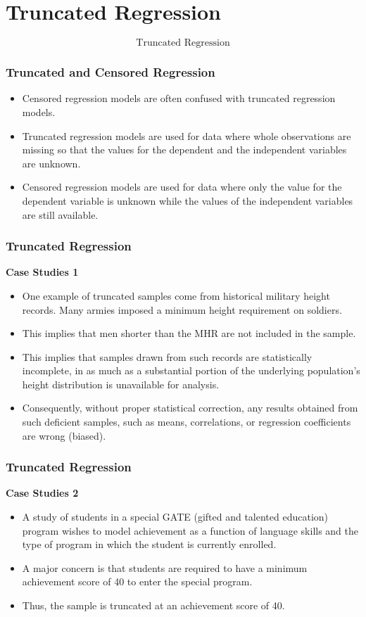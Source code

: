 \documentclass{beamer}
\begin{document}
\section{Truncated Regression}
\begin{frame}
	\LARGE
	\[\mbox{Truncated Regression}\]
\end{frame}
\begin{frame}[fragile]
	\frametitle{Truncated and Censored Regression}
	\large
	\begin{itemize}
		\item Censored regression models are often confused with truncated regression models. 
		\item Truncated regression models are used for data where whole observations are missing so that the values for the dependent and the independent variables are unknown. \item Censored regression models are used for data where only the value for the dependent variable  is unknown while the values of the independent variables are still available.
	\end{itemize}
	
\end{frame}
\begin{frame}
	\frametitle{Truncated Regression}
	\noindent \textbf{Case Studies 1}
	\begin{itemize}
		\item One example of truncated samples come from historical military height records. Many armies imposed a minimum height requirement on soldiers. 
		\item This implies that men shorter than the MHR are not included in the sample. 
		\item This implies that samples drawn from such records are statistically incomplete, in as much as a substantial portion of the underlying population's height distribution is unavailable for analysis. 
		\item Consequently, without proper statistical correction, any results obtained from such deficient samples, such as means, correlations, or regression coefficients are wrong (biased). 
	\end{itemize}
\end{frame}
\begin{frame}
	\frametitle{Truncated Regression}
	\noindent \textbf{Case Studies 2}
	\begin{itemize}
		\item A study of students in a special GATE (gifted and talented education) program wishes to model achievement as a function of language skills and the type of program in which the student is currently enrolled. 
		\item A major concern is that students are required to have a minimum achievement score of 40 to enter the special program. 
		\item Thus, the sample is truncated at an achievement score of 40.
		\end{itemize}
	\end{frame}	
\end{document}
